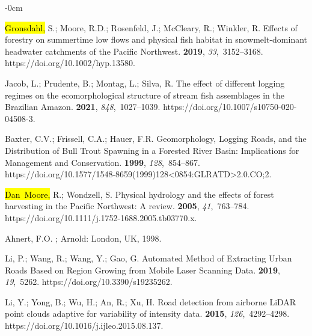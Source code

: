 \documentclass[remotesensing,article,accept,pdftex,moreauthors]{Definitions/mdpi}
\begin{document}
\begin{adjustwidth}{-\extralength}{0cm}
\begin{thebibliography}{999}
\hl{Gronsdahl,} %
 S.; Moore, R.D.; Rosenfeld, J.; McCleary, R.; Winkler, R.
\newblock Effects of forestry on summertime low flows and physical fish habitat
  in snowmelt-dominant headwater catchments of the Pacific Northwest.
 {\bf 2019}, {\em 33},~3152--3168. https://doi.org/10.1002/hyp.13580.

Jacob, L.; Prudente, B.; Montag, L.; Silva, R.
\newblock The effect of different logging regimes on the ecomorphological
  structure of stream fish assemblages in the Brazilian Amazon.
 {\bf 2021}, {\em 848},~{1027--1039.}
\newblock https://doi.org/10.1007/s10750-020-04508-3.

Baxter, C.V.; Frissell, C.A.; Hauer, F.R.
\newblock Geomorphology, Logging Roads, and the Distribution of Bull Trout
  Spawning in a Forested River Basin: Implications for Management and
  Conservation.
 {\bf
  1999}, {\em 128},~854--867. https://doi.org/10.1577/1548-8659(1999)128<0854:GLRATD>2.0.CO;2.

\hl{Dan~Moore,} %
 R.; Wondzell, S.
\newblock Physical hydrology and the effects of forest harvesting in the
  Pacific Northwest: A review.
 {\bf 2005},
  {\em 41},~763--784. https://doi.org/10.1111/j.1752-1688.2005.tb03770.x.

Ahnert, F.O.
; Arnold: London, UK, 1998.

Li, P.; Wang, R.; Wang, Y.; Gao, G.
\newblock Automated Method of Extracting Urban Roads Based on Region Growing
  from Mobile Laser Scanning Data.
 {\bf 2019}, {\em 19},~5262. https://doi.org/10.3390/s19235262.

Li, Y.; Yong, B.; Wu, H.; An, R.; Xu, H.
\newblock Road detection from airborne LiDAR point clouds adaptive for
  variability of intensity data.
 {\bf 2015}, {\em 126},~4292--4298.
\newblock https://doi.org/10.1016/j.ijleo.2015.08.137.


\end{thebibliography}
\end{adjustwidth}
\end{document}
